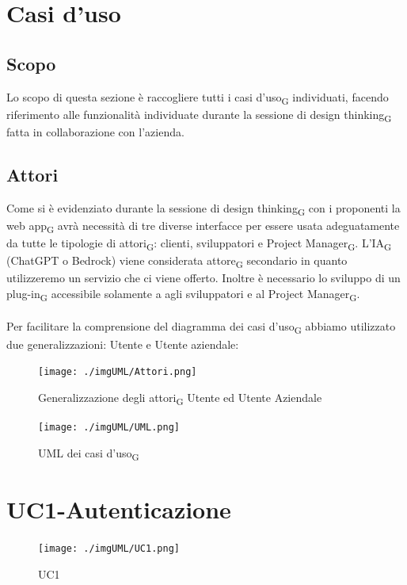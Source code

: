 \documentclass{article}
\newcommand{\custombold}{\contour{black}}
\begin{document}
\section*{Casi d'uso}
\subsection*{Scopo}
Lo scopo di questa sezione è raccogliere tutti i casi d'uso\textsubscript{G} individuati, facendo riferimento alle funzionalità individuate durante la sessione di design thinking\textsubscript{G} fatta in collaborazione con l'azienda.

\subsection*{Attori}
Come si è evidenziato durante la sessione di design thinking\textsubscript{G} con i proponenti la web app\textsubscript{G} avrà necessità di tre diverse interfacce per essere usata adeguatamente da tutte le tipologie di attori\textsubscript{G}: clienti, sviluppatori e Project Manager\textsubscript{G}. L'IA\textsubscript{G}  (ChatGPT o Bedrock) viene considerata attore\textsubscript{G} secondario in quanto utilizzeremo un servizio che ci viene offerto. Inoltre è necessario lo sviluppo di un plug-in\textsubscript{G} accessibile solamente a agli sviluppatori e al Project Manager\textsubscript{G}.\\\\

Per facilitare la comprensione del diagramma dei casi d'uso\textsubscript{G}  abbiamo utilizzato due generalizzazioni: Utente e Utente aziendale: 

\begin{figure}[h]
    \centering
    \texttt{[image: ./imgUML/Attori.png]}
    \caption{Generalizzazione degli attori\textsubscript{G} Utente ed Utente Aziendale}
    \label{fig:attori}
\end{figure}

\newpage
\custombold{UML Casi d'uso}
\begin{figure}[h]
    \centering
    \texttt{[image: ./imgUML/UML.png]}
    \caption{UML dei casi d'uso\textsubscript{G}}
    \label{fig:UML}
\end{figure}
\newpage

\section{UC1-Autenticazione}
    \begin{figure}[h]
      \centering
      \texttt{[image: ./imgUML/UC1.png]}
      \caption{UC1}
      \label{fig:UC1}
    \end{figure} 
    
\end{document}
